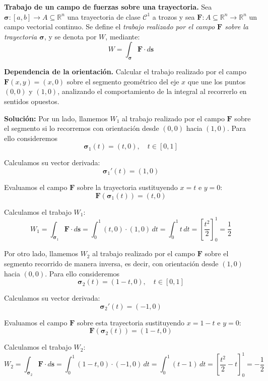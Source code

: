 \begin{definition}\label{def:trabajo_trayectoria}\textbf{Trabajo de un campo de fuerzas sobre una trayectoria.} 
Sea $\boldsymbol{\sigma} : [a, b] \to A \subseteq \mathbb{R}^n$ una trayectoria de clase $\mathcal{C}^1$ a trozos y sea $\mathbf{F} : A \subseteq \mathbb{R}^n \to \mathbb{R}^n$ un campo vectorial continuo. Se define el \emph{trabajo realizado por el campo $\mathbf{F}$ sobre la trayectoria $\boldsymbol{\sigma}$}, y se denota por $W$, mediante:
\[ 
W = \int_{\boldsymbol{\sigma}} \mathbf{F} \cdot d\mathbf{s}  
\] 
\end{definition}


\begin{example} \textbf{Dependencia de la orientación.}
 Calcular  el trabajo realizado por el campo \( \mathbf{F}(x, y) = (x, 0) \)  sobre el segmento geométrico del eje $x$  que une los puntos $(0,0)$ y $(1,0)$,   analizando el comportamiento de la integral al recorrerlo en sentidos opuestos.
\end{example}

\noindent\textbf{Solución:} Por un lado, llamemos $W_1$ al trabajo realizado por el campo  $\mathbf{F}$  sobre el segmento si lo recorremos con orientación desde $(0,0)$ hacia $(1,0)$.  Para ello consideremos
\[ \boldsymbol{\sigma}_1(t) = (t, 0), \quad t \in [0, 1] \]

Calculamos su vector derivada:
\[ \boldsymbol{\sigma}_1'(t) = (1, 0) \]

Evaluamos el campo $\mathbf{F}$ sobre la trayectoria sustituyendo $x = t$ e $y = 0$:
\[ \mathbf{F}(\boldsymbol{\sigma}_1(t)) = (t, 0) \]

Calculamos el trabajo $W_1$:
\[ W_1 = \int_{\boldsymbol{\sigma}_1} \mathbf{F} \cdot d\mathbf{s} = \int_{0}^{1} (t, 0) \cdot (1, 0) \, dt = \int_{0}^{1} t \, dt = \left[ \frac{t^2}{2} \right]_{0}^{1} = \frac{1}{2} \]

Por otro lado, llamemos $W_2$ al trabajo realizado por el campo  $\mathbf{F}$  sobre el segmento recorrido de manera inversa, es decir,  con orientación desde $(1,0)$ hacia $(0,0)$.  Para ello consideremos
\[ \boldsymbol{\sigma}_2(t) = (1-t, 0), \quad t \in [0, 1] \]

Calculamos su vector derivada:
\[ \boldsymbol{\sigma}_2'(t) = (-1, 0) \]

Evaluamos el campo $\mathbf{F}$ sobre esta trayectoria sustituyendo $x = 1-t$ e $y = 0$:
\[ \mathbf{F}(\boldsymbol{\sigma}_2(t)) = (1-t, 0) \]

Calculamos el trabajo $W_2$:
\[ W_2 = \int_{\boldsymbol{\sigma}_2} \mathbf{F} \cdot d\mathbf{s} = \int_{0}^{1} (1-t, 0) \cdot (-1, 0) \, dt = \int_{0}^{1} (t-1) \, dt = \left[ \frac{t^2}{2} - t \right]_{0}^{1} = -\frac{1}{2} \]

